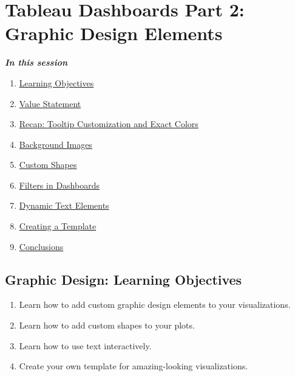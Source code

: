 \documentclass[
]{book}
\providecommand{\tightlist}{%
  \setlength{\itemsep}{0pt}\setlength{\parskip}{0pt}}
\begin{document}
\hypertarget{tableau-dashboards-part-2-graphic-design-elements}{%
\section{Tableau Dashboards Part 2: Graphic Design Elements}\label{tableau-dashboards-part-2-graphic-design-elements}}

\textbf{\emph{In this session }}

\begin{enumerate}
\def\labelenumi{\arabic{enumi}.}
\tightlist
\item
  \protect\hyperlink{graphic-design-learning-objectives}{Learning Objectives}
\item
  \protect\hyperlink{graphic-design-value-statement}{Value Statement}
\item
  \protect\hyperlink{recap-tooltip-customization-and-exact-colors}{Recap: Tooltip Customization and Exact Colors}
\item
  \protect\hyperlink{background-images}{Background Images}
\item
  \protect\hyperlink{custom-shapes}{Custom Shapes}
\item
  \protect\hyperlink{filters-in-dashboards}{Filters in Dashboards}
\item
  \protect\hyperlink{dynamic-text-elements}{Dynamic Text Elements}
\item
  \protect\hyperlink{creating-a-template}{Creating a Template}
\item
  \protect\hyperlink{graphic-design-conclusions}{Conclusions}
\end{enumerate}

\hypertarget{graphic-design-learning-objectives}{%
\subsection{Graphic Design: Learning Objectives}\label{graphic-design-learning-objectives}}

\begin{enumerate}
\def\labelenumi{\arabic{enumi}.}
\tightlist
\item
  Learn how to add custom graphic design elements to your visualizations.
\item
  Learn how to add custom shapes to your plots.
\item
  Learn how to use text interactively.
\item
  Create your own template for amazing-looking visualizations.
\end{enumerate}
\end{document}

